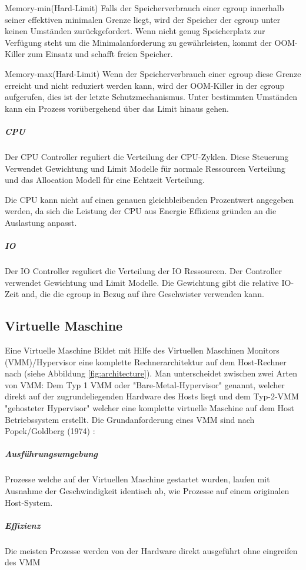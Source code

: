 Memory-min(Hard-Limit)
Falls der Speicherverbrauch einer cgroup innerhalb seiner effektiven minimalen Grenze liegt, wird der Speicher der cgroup unter keinen Umständen zurückgefordert. Wenn nicht genug Speicherplatz zur Verfügung steht um die Minimalanforderung zu gewährleisten, kommt der OOM-Killer zum Einsatz und schafft freien Speicher.

Memory-max(Hard-Limit)
Wenn der Speicherverbrauch einer cgroup diese Grenze erreicht und nicht reduziert werden kann, wird der OOM-Killer in der cgroup aufgerufen, dies ist der letzte Schutzmechanismus. Unter bestimmten Umständen kann ein Prozess vorübergehend über das Limit hinaus gehen.

\subparagraph{CPU}
Der CPU Controller reguliert die Verteilung der CPU-Zyklen. Diese Steuerung Verwendet Gewichtung und Limit Modelle für normale Ressourcen Verteilung und das Allocation Modell für eine Echtzeit Verteilung.

Die CPU kann nicht auf einen genauen gleichbleibenden Prozentwert angegeben werden, da sich die Leistung der CPU aus Energie Effizienz gründen an die Auslastung anpasst.

\subparagraph{IO}
Der IO Controller reguliert die Verteilung der IO Ressourcen. Der Controller verwendet Gewichtung und Limit Modelle. Die Gewichtung gibt die relative IO-Zeit and, die die cgroup in Bezug auf ihre Geschwister verwenden kann.


\subsection{Virtuelle Maschine}
Eine Virtuelle Maschine Bildet mit Hilfe des Virtuellen Maschinen Monitors (VMM)/Hypervisor eine komplette Rechnerarchitektur auf dem Host-Rechner nach (siehe Abbildung \ref{fig:architecture}). Man unterscheidet zwischen zwei Arten von VMM: Dem Typ 1 VMM oder "Bare-Metal-Hypervisor" genannt, welcher direkt auf der zugrundeliegenden Hardware des Hosts liegt und dem Typ-2-VMM "gehosteter Hypervisor" welcher eine komplette virtuelle Maschine auf dem Host Betriebssystem erstellt. Die Grundanforderung eines VMM sind nach Popek/Goldberg (1974) \cite{Popek1974FormalArchitectures,Glatz2015Betriebssysteme} :

\subparagraph{Ausführungsumgebung}
Prozesse welche auf der Virtuellen Maschine gestartet wurden, laufen mit Ausnahme der Geschwindigkeit identisch ab, wie Prozesse auf einem originalen Host-System.

\subparagraph{Effizienz}
Die meisten Prozesse werden von der Hardware direkt ausgeführt ohne eingreifen des VMM

